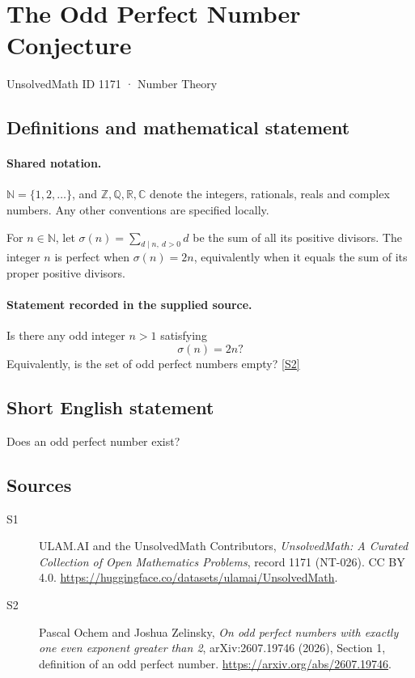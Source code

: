 \documentclass[11pt]{article}
\newcommand{\sref}[2]{\hyperlink{source:#1:#2}{[S#2]}}
\begin{document}
\setcounter{section}{1170}
\section{The Odd Perfect Number Conjecture}\label{1171}
{\small\sffamily UnsolvedMath ID 1171 · Number Theory}
\subsection{Definitions and mathematical statement}

\paragraph{Shared notation.}$\mathbb N=\{1,2,\ldots\}$, and $\mathbb Z,\mathbb Q,\mathbb R,\mathbb C$ denote the integers, rationals, reals and complex numbers. Any other conventions are specified locally.


For \(n\in\mathbb N\), let
\(\sigma(n)=\sum_{d\mid n,\ d>0}d\) be the sum of all its positive
divisors.  The integer \(n\) is perfect when \(\sigma(n)=2n\),
equivalently when it equals the sum of its proper positive divisors.
\paragraph{Statement recorded in the supplied source.}
Is there any odd integer \(n>1\) satisfying
\[
 \sigma(n)=2n?
\]
Equivalently, is the set of odd perfect numbers empty? \sref{1171}{2}
\subsection{Short English statement}
Does an odd perfect number exist?
\subsection{Sources}
\begin{description}
\item[\hypertarget{source:1171:1}{S1}] ULAM.AI and the UnsolvedMath Contributors, \emph{UnsolvedMath: A Curated Collection of Open Mathematics Problems}, record 1171 (NT-026). CC BY 4.0. \url{https://huggingface.co/datasets/ulamai/UnsolvedMath}.
\item[\hypertarget{source:1171:2}{S2}] Pascal Ochem and Joshua Zelinsky, \emph{On odd perfect numbers with exactly one even exponent greater than 2}, arXiv:2607.19746 (2026), Section 1, definition of an odd perfect number. \url{https://arxiv.org/abs/2607.19746}.
\end{description}
\label{end:1171}
\end{document}
